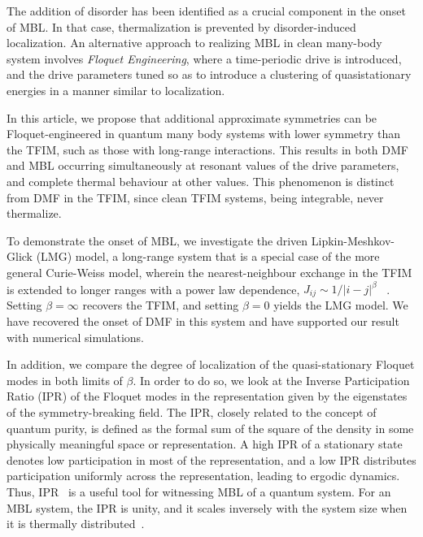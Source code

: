 \documentclass[%
reprint,
superscriptaddress,
amsmath,amssymb,
aps,
prb,
showkeys,
]{revtex4-2}
\begin{document}
	The addition of disorder has been identified as a crucial component in the onset of MBL. In that case, thermalization is prevented by disorder-induced localization. An alternative approach to realizing MBL in clean many-body system involves \textit{Floquet Engineering}, where a time-periodic drive is introduced, and the drive parameters tuned so as to introduce a clustering of quasistationary energies in a manner similar to localization\cite{zhang_floquet_2016}.
	

	
	In this article, we propose that additional approximate symmetries can be Floquet-engineered in quantum many body systems with lower symmetry than the TFIM, such as those with long-range interactions. This results in both DMF and MBL occurring simultaneously at resonant values of the drive parameters, and complete thermal behaviour at other values. This phenomenon is distinct from DMF in the TFIM, since clean TFIM systems, being integrable, never thermalize.
	
	
	To demonstrate the onset of MBL, we investigate the driven Lipkin-Meshkov-Glick (LMG) model, a long-range system that is a special case of the more general Curie-Weiss model, wherein the nearest-neighbour exchange in the TFIM is extended to longer ranges with a power law dependence, $J_{ij}\sim 1/|i-j|^\beta$  ~\cite{campa_statistical_2009, eisele_multiple_1988, canning_class_1992}. Setting $\beta=\infty$ recovers the TFIM, and setting $\beta=0$ yields the LMG model. We have recovered the onset of DMF in this system and have supported our result with numerical simulations.
	
	In addition, we compare the degree of localization of the quasi-stationary Floquet modes in both limits of $\beta$. In order to do so, we look at the Inverse Participation Ratio (IPR) of the Floquet modes in the representation given by the eigenstates of the symmetry-breaking field. The IPR, closely related to the concept of quantum purity, is defined as the formal sum of the square of the density in some physically meaningful space or representation. A high IPR of a stationary state denotes low participation in most of the representation, and a low IPR distributes participation uniformly across the representation, leading to ergodic dynamics\cite{vu_fermionic_2022}. Thus, IPR~\cite{Misguich2016} is a useful tool for witnessing MBL of a quantum system. For an MBL system, the IPR is unity, and it scales inversely with the system size when it is thermally distributed~\cite{calixto_inverse_2015}.
	
\end{document}
